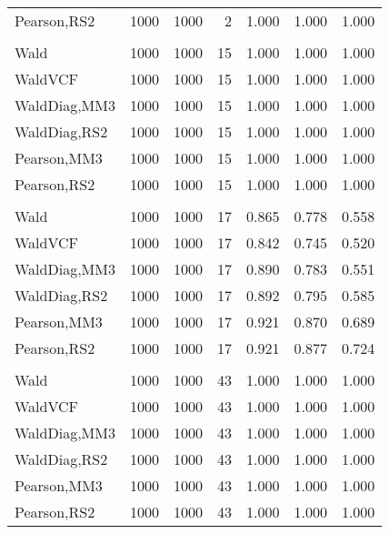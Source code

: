 \documentclass[
]{article}
\begin{document}
\begin{table}[H]
{\begin{tabular}[t]{lrrrrrr}
\hspace{1em}Pearson,RS2 & 1000 & 1000 & 2 & 1.000 & 1.000 & 1.000\\
\addlinespace[0.3em]
\multicolumn{7}{l}{\textbf{1F 15V}}\\
\hspace{1em}Wald & 1000 & 1000 & 15 & 1.000 & 1.000 & 1.000\\
\hspace{1em}WaldVCF & 1000 & 1000 & 15 & 1.000 & 1.000 & 1.000\\
\hspace{1em}WaldDiag,MM3 & 1000 & 1000 & 15 & 1.000 & 1.000 & 1.000\\
\hspace{1em}WaldDiag,RS2 & 1000 & 1000 & 15 & 1.000 & 1.000 & 1.000\\
\hspace{1em}Pearson,MM3 & 1000 & 1000 & 15 & 1.000 & 1.000 & 1.000\\
\hspace{1em}Pearson,RS2 & 1000 & 1000 & 15 & 1.000 & 1.000 & 1.000\\
\addlinespace[0.3em]
\multicolumn{7}{l}{\textbf{2F 10V}}\\
\hspace{1em}Wald & 1000 & 1000 & 17 & 0.865 & 0.778 & 0.558\\
\hspace{1em}WaldVCF & 1000 & 1000 & 17 & 0.842 & 0.745 & 0.520\\
\hspace{1em}WaldDiag,MM3 & 1000 & 1000 & 17 & 0.890 & 0.783 & 0.551\\
\hspace{1em}WaldDiag,RS2 & 1000 & 1000 & 17 & 0.892 & 0.795 & 0.585\\
\hspace{1em}Pearson,MM3 & 1000 & 1000 & 17 & 0.921 & 0.870 & 0.689\\
\hspace{1em}Pearson,RS2 & 1000 & 1000 & 17 & 0.921 & 0.877 & 0.724\\
\addlinespace[0.3em]
\multicolumn{7}{l}{\textbf{3F 15V}}\\
\hspace{1em}Wald & 1000 & 1000 & 43 & 1.000 & 1.000 & 1.000\\
\hspace{1em}WaldVCF & 1000 & 1000 & 43 & 1.000 & 1.000 & 1.000\\
\hspace{1em}WaldDiag,MM3 & 1000 & 1000 & 43 & 1.000 & 1.000 & 1.000\\
\hspace{1em}WaldDiag,RS2 & 1000 & 1000 & 43 & 1.000 & 1.000 & 1.000\\
\hspace{1em}Pearson,MM3 & 1000 & 1000 & 43 & 1.000 & 1.000 & 1.000\\
\hspace{1em}Pearson,RS2 & 1000 & 1000 & 43 & 1.000 & 1.000 & 1.000\\
\bottomrule
\end{tabular}}
\endgroup{}
\end{table}
\end{document}
